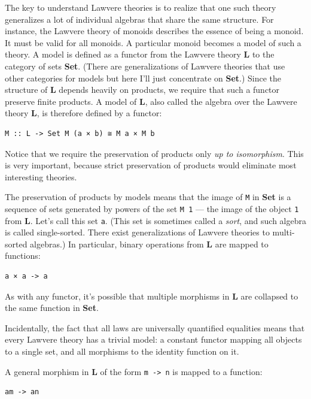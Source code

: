 The key to understand Lawvere theories is to realize that one such
theory generalizes a lot of individual algebras that share the same
structure. For instance, the Lawvere theory of monoids describes the
essence of being a monoid. It must be valid for all monoids. A
particular monoid becomes a model of such a theory. A model is defined
as a functor from the Lawvere theory \textbf{L} to the category of sets
\textbf{Set}. (There are generalizations of Lawvere theories that use
other categories for models but here I'll just concentrate on
\textbf{Set}.) Since the structure of \textbf{L} depends heavily on
products, we require that such a functor preserve finite products. A
model of \textbf{L}, also called the algebra over the Lawvere theory
\textbf{L}, is therefore defined by a functor:

\begin{verbatim}
M :: L -> Set M (a × b) ≅ M a × M b
\end{verbatim}

Notice that we require the preservation of products only \emph{up to
isomorphism}. This is very important, because strict preservation of
products would eliminate most interesting theories.

The preservation of products by models means that the image of
\texttt{M} in \textbf{Set} is a sequence of sets generated by powers of
the set \texttt{M\ 1} --- the image of the object \texttt{1} from
\textbf{L}. Let's call this set \texttt{a}. (This set is sometimes
called a \emph{sort}, and such algebra is called single-sorted. There
exist generalizations of Lawvere theories to multi-sorted algebras.) In
particular, binary operations from \textbf{L} are mapped to functions:

\begin{verbatim}
a × a -> a
\end{verbatim}

As with any functor, it's possible that multiple morphisms in \textbf{L}
are collapsed to the same function in \textbf{Set}.

Incidentally, the fact that all laws are universally quantified
equalities means that every Lawvere theory has a trivial model: a
constant functor mapping all objects to a single set, and all morphisms
to the identity function on it.

A general morphism in \textbf{L} of the form
\texttt{m\ -\textgreater{}\ n} is mapped to a function:

\begin{verbatim}
am -> an
\end{verbatim}

